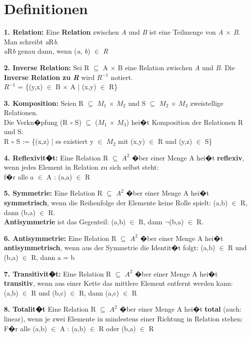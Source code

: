 \section*{Definitionen}
\vspace{-0.3cm}

\textbf{1. Relation:} Eine \textbf{Relation} zwischen \textit{A} und \textit{B} ist eine Teilmenge von \textit{A $\times$ B}. Man schreibt \textit{a}R\textit{b}.\\
\textit{a}R\textit{b} genau dann, wenn (\textit{a}, \textit{b}) $\in$ \textit{R}

\textbf{2. Inverse Relation:} Sei R $\subseteq$ A $\times$ B eine Relation zwischen \textit{A} und \textit{B}.
Die \textbf{Inverse Relation zu \textit{R}} wird $R^{-1}$ notiert.\\
$R^{-1}$ = \{(y,x) $\in$ B $\times$ A | (x,y) $\in$ R\}

\textbf{3. Komposition:} Seien R $\subseteq$ $M_1$ $\times$ $M_2$ und S $\subseteq$ $M_2$ $\times$ $M_3$ zweistellige Relationen.\\
Die Verkn�pfung (R $\circ$ S) $\subseteq$ ($M_1$ $\times$ $M_3$) hei�t Komposition der Relationen R
und S:\\
R $\circ$ S := \{(x,z) | es existiert y $\in$ $M_2$ mit (x,y) $\in$ R und (y,z) $\in$ S\}

\textbf{4. Reflexivit�t:} Eine Relation R $\subseteq$ $A^2$ �ber einer Menge A hei�t \textbf{reflexiv}, wenn jedes Element in Relation zu sich selbst steht:\\
f�r alle a $\in$ A : (a,a) $\in$ R

\textbf{5. Symmetrie:} Eine Relation R $\subseteq$ $A^2$ �ber einer Menge A hei�t \textbf{symmetrisch}, wenn die Reihenfolge der Elemente keine Rolle spielt: (a,b) $\in$ R, dann (b,a) $\in$ R.\\
\textbf{Antisymmetrie} ist das Gegenteil: (a,b) $\in$ R, dann $\neg$(b,a) $\in$ R.

\textbf{6. Antisymmetrie:} Eine Relation R $\subseteq$ $A^2$ �ber einer Menge A hei�t \textbf{antisymmetrisch}, wenn aus der Symmetrie die Identit�t folgt:
(a,b) $\in$ R und (b,a) $\in$ R, dann a = b

\textbf{7. Transitivit�t:} Eine Relation R $\subseteq$ $A^2$ �ber einer Menge A hei�t \textbf{transitiv}, wenn aus einer Kette das mittlere Element entfernt werden kann:\\
(a,b) $\in$ R und (b,c) $\in$ R, dann (a,c) $\in$ R

\textbf{8. Totalit�t} Eine Relation R $\subseteq$ $A^2$ �ber einer Menge A hei�t \textbf{total} (auch: linear), wenn je zwei Elemente in mindestens einer Richtung
in Relation stehen: \\
F�r alle (a,b) $\in$ A : (a,b) $\in$ R oder (b,a) $\in$ R

